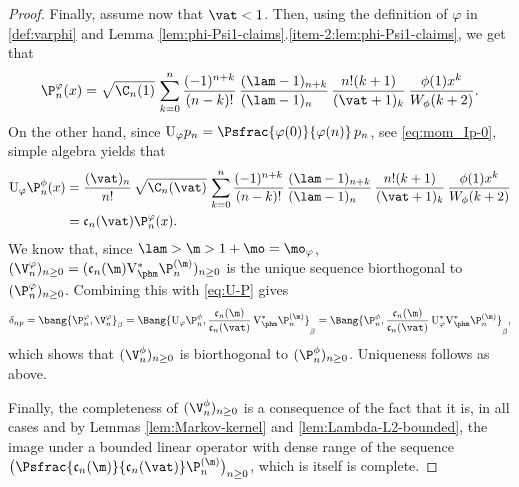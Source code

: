 \begin{proof}
Finally, assume now that $\vat < 1$. Then, using the definition of $\varphi$ in \eqref{def:varphi} and
Lemma \ref{lem:phi-Psi1-claims}.\eqref{item-2:lem:phi-Psi1-claims}, we get that
\begin{align*}
\P_n^\varphi(x) = \sqrt{\C_n(1)}\, \sum_{k=0}^n \frac{(-1)^{n+k}}{(n-k)!}\, \frac{(\lam-1)_{n+k}}{(\lam-1)_{n\phantom{+k}}}\, \frac{n!(k+1)}{(\vat+1)_{k}}\, \frac{\phi(1) x^k}{W_\phi(k+2)}.
\end{align*}
On the other hand, since $\mathrm{U}_\varphi p_n = \Psfrac{\varphi(0)}{\varphi(n)}\,p_n$, see \eqref{eq:mom_Ip-0}, simple algebra yields that
\begin{equation}
\label{eq:U-P}
\begin{split}
\mathrm{U}_\varphi \P_n^\phi(x) &= \frac{(\vat)_n}{n!}\,\sqrt{\C_n(\vat)}\, \sum_{k=0}^n \frac{(-1)^{n+k}}{(n-k)!}\, \frac{(\lam-1)_{n+k}}{(\lam-1)_{n\phantom{+k}}}\, \frac{n!(k+1)}{(\vat+1)_k}\,\frac{\phi(1) x^k}{W_\phi(k+2)}\\
&= \mathfrak{c}_n(\vat) \P_n^\varphi(x).
\end{split}
\end{equation}
We know that, since $\lam > \m > 1+\mo = \mo_\varphi$, $(\V_n^\varphi)_{n\geq 0} = (\mathfrak{c}_n(\m) {\mathrm{V}}_{\phm}^* \P_n^{(\m)})_{n\geq 0}$ is the unique sequence biorthogonal to $(\P_n^\varphi)_{n \geq 0}$. Combining this with \eqref{eq:U-P} gives
\[
\delta_{np} = \bang{\P_n^\varphi, \V_n^\varphi }_{\beta} =
\Bang{ \mathrm{U}_\varphi \P_n^\phi, \frac{\mathfrak{c}_n(\m)}{\mathfrak{c}_n(\vat)}\, {\mathrm{V}}_{\phm}^* \P_n^{(\m)}}_{\beta}
= \Bang{ \P_n^\phi, \frac{\mathfrak{c}_n(\m)}{\mathfrak{c}_n(\vat)}\, \mathrm{U}_\varphi^* {\mathrm{V}}_{\phm}^* \P_n^{(\m)}}_{\beta},
\]
which shows that $(\V_n^\phi)_{n \geq 0}$ is biorthogonal to $(\P_n^{\phi})_{n \ge 0}$.
Uniqueness follows as above.

Finally, the completeness of $(\V_n^\phi)_{n \geq 0}$ is a consequence of the fact that it is, in all cases and by Lemmas \ref{lem:Markov-kernel} and \ref{lem:Lambda-L2-bounded}, the image under a bounded linear operator with dense range of the sequence $\bigl(\Psfrac{\mathfrak{c}_n(\m)}{\mathfrak{c}_n(\vat)} \P_n^{(\m)}\bigr)_{n \geq 0}$, which is itself is complete.
\end{proof}

